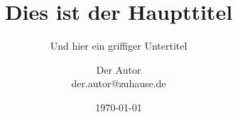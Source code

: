 \documentclass[aspectratio=43]{beamer}
\begin{document}

\title{Dies ist der Haupttitel}
\subtitle{Und hier ein griffiger Untertitel}
\author{Der Autor\\der.autor@zuhause.de}
\date{\today}
\frame[plain]{\maketitle}

\end{document}
